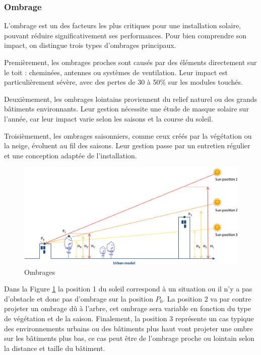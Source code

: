 \subsubsection{Ombrage}
\par{L'ombrage est un des facteurs les plus critiques pour une installation solaire, pouvant réduire significativement ses performances. Pour bien comprendre son impact, on distingue trois types d'ombrages principaux.}

\par{Premièrement, les ombrages proches sont causés par des éléments directement sur le toit : cheminées, antennes ou systèmes de ventilation. Leur impact est particulièrement sévère, avec des pertes de 30 à 50\% sur les modules touchés.}

\par{Deuxièmement, les ombrages lointains proviennent du relief naturel ou des grands bâtiments environnants. Leur gestion nécessite une étude de masque solaire sur l'année, car leur impact varie selon les saisons et la course du soleil.}

\par{Troisièmement, les ombrages saisonniers, comme ceux créés par la végétation ou la neige, évoluent au fil des saisons. Leur gestion passe par un entretien régulier et une conception adaptée de l'installation.}

\begin{figure}[H]
    \centering
    \includegraphics[width=1.00\linewidth]{03-tail//A2_fondamentaux_energie//A2_figures/A2_ombrage.jpg}
    \caption{Ombrages \cite{desthieux_solar_2018}}
    \label{fig:ombrage}
\end{figure}

\par{Dans la Figure \ref{fig:ombrage} la position 1 du soleil correspond à un situation ou il n'y a pas d'obstacle et donc pas d'ombrage sur la position $P_0$. La position 2 va par contre projeter un ombrage dû à l'arbre, cet ombrage sera variable en fonction du type de végétation et de la saison. Finalement, la position 3 représente un cas typique des environnements urbains ou des bâtiments plus haut vont projeter une ombre sur les bâtiments plus bas, ce cas peut être de l'ombrage proche ou lointain selon la distance et taille du bâtiment.}


